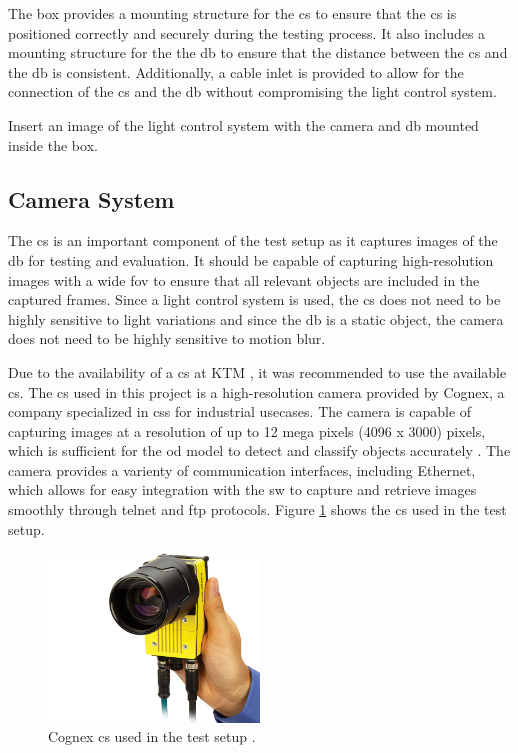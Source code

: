 The box provides a mounting structure for the \gls{cs} to ensure that the \gls{cs} is positioned correctly and securely during the testing process. It also includes a mounting structure for the the \gls{db} to ensure that the distance between the \gls{cs} and the \gls{db} is consistent. Additionally, a cable inlet is provided to allow for the connection of the \gls{cs} and the \gls{db} without compromising the light control system.

Insert an image of the light control system with the camera and \gls{db} mounted inside the box.

\subsection{Camera System}
The \gls{cs} is an important component of the test setup as it captures images of the \gls{db} for testing and evaluation. It should be capable of capturing high-resolution images with a wide \gls{fov} to ensure that all relevant objects are included in the captured frames. Since a light control system is used, the \gls{cs} does not need to be highly sensitive to light variations and since the \gls{db} is a static object, the camera does not need to be highly sensitive to motion blur.

Due to the availability of a \gls{cs} at KTM , it was recommended to use the available \gls{cs}. The \gls{cs} used in this project is a high-resolution camera provided by Cognex, a company specialized in \gls{cs}s for industrial usecases. The camera is capable of capturing images at a resolution of up to 12 mega pixels (4096 x 3000) pixels, which is sufficient for the \gls{od} model to detect and classify objects accurately \cite{Cognex_Camera}. The camera provides a varienty of communication interfaces, including Ethernet, which allows for easy integration with the \gls{sw} to capture and retrieve images smoothly through \gls{telnet} and \gls{ftp} protocols. Figure \ref{Cognex_Camera} shows the \gls{cs} used in the test setup.

\begin{figure}[!htb]
    \centering
    \includegraphics[width=0.5\textwidth]{Figures/In-Sight 9000 in hand.jpg}
    \caption{Cognex \gls{cs} used in the test setup \cite{Cognex_Camera}.}
    \label{Cognex_Camera}
\end{figure}

